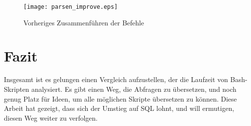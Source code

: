 \begin{figure}
\centering
\texttt{[image: parsen\_improve.eps]}
\caption{Vorheriges Zusammenführen der Befehle}
\label{fig:improve}
\end{figure}

\section{Fazit}
Insgesamt ist es gelungen einen Vergleich aufzustellen, der die Laufzeit von Bash-Skripten analysiert. Es gibt einen Weg, die Abfragen zu übersetzen, und noch genug Platz für Ideen, um alle möglichen Skripte übersetzen zu können.
Diese Arbeit hat gezeigt, dass sich der Umstieg auf SQL lohnt, und will ermutigen, diesen Weg weiter zu verfolgen.
